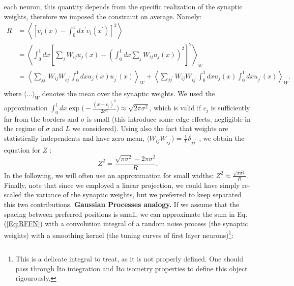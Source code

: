 \documentclass[a4paper]{article}%
\begin{document}
each neuron, this quantity depends from the specific realization of the
synaptic weights, therefore we imposed the constraint on average. Namely:
\begin{equation}
\begin{split}
R & = \left\langle \left[  v_{i}\left(  x\right)  -\int_{0}^{1}dx^{\prime}
v_{i}\left(  x^{\prime}\right)  \right]  ^{2} \right \rangle\\
& =\left\langle \int_{0}^{1} dx \left[\sum_{j} W_{ij} u_{j}(x) - \left(\int
_{0}^{1} dx \sum_{j} W_{ij} u_{j}(x) \right)^{2} \right]^{2} \right\rangle_{W}\\
& = \left\langle \sum_{jj^{\prime}} W_{ij} W_{ij^{\prime}}\int_{0}^{1} dx
u_{j}(x)u_{j^{\prime}}(x)\right\rangle_{W} +\left\langle \sum_{jj^{\prime}}
W_{ij}W_{ij^{\prime}}\int_{0}^{1} dx u_{j}(x) \int_{0}^{1} dx u_{j^{\prime}
}(x)\right\rangle_{W}.\\
\end{split}
\end{equation}
where $\langle\dots\rangle_{W}$ denotes the mean over the synaptic weights. We
used the approximation $\int_{0}^{1} dx \exp\Big(-\frac{(x-c_{j})^{2}}{2
\sigma^{2}}\Big) \approx\sqrt{2\pi\sigma^{2}}$, which is valid if $c_{j}$ is
sufficiently far from the borders and $\sigma$ is small (this introduce
some edge effects, negligible in the regime of $\sigma$ and $L$ we
considered). Using also the fact that weights are statistically independents
and have zero mean, $\langle W_{ij}W_{ij^{\prime}} \rangle= \frac{1}{L}
\delta_{jj^{\prime}}$ , we obtain the equation for $Z$ :
\begin{equation}
Z^{2} = \frac{\sqrt{\pi\sigma^{2}} - 2\pi\sigma^{2}}{R}.
\end{equation}
In the following, we will often use an approximation for small widths: $Z^{2}
\approx\frac{\sqrt{\pi\sigma^{2}}}{R}$. Finally, note that since we employed a linear projection, we could have
simply re-scaled the variance of the synaptic weights, but we preferred to
keep separated this two contributions. 
\newline\newline
\textbf{Gaussian
Processes analogy.} If we assume that the spacing between preferred positions
is small, we can approximate the sum in Eq.(\ref{Eq:RFFN}) with a convolution
integral of a random noise process (the synaptic weights) with a smoothing
kernel (the tuning curves of first layer neurons)\footnote{This is a delicate
integral to treat, as it is not properly defined. One should pass through Ito
integration and Ito isometry properties to define this object rigourously.}:
\end{document}
